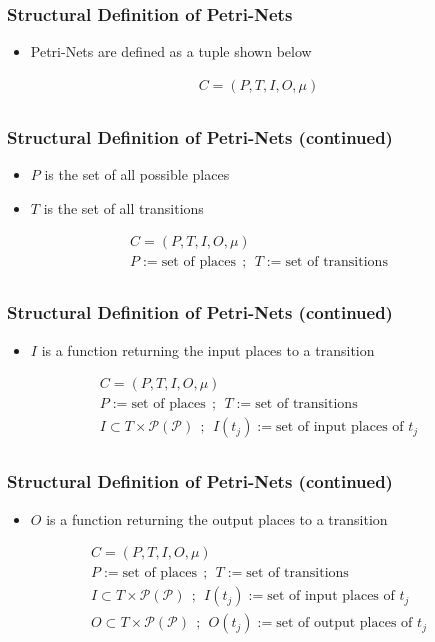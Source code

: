 \begin{frame}
    \frametitle{Structural Definition of Petri-Nets}
    \begin{itemize}
        \item {Petri-Nets are defined as a tuple shown below}
    \end{itemize}
    \begin{gather*}
        C = (P, T, I, O, \mu) \\
    \end{gather*}
\end{frame}
\begin{frame}
    \frametitle{Structural Definition of Petri-Nets (continued)}
    \begin{itemize}
        \item {$P$ is the set of all possible places}
        \item {$T$ is the set of all transitions}
    \end{itemize}
    \begin{gather*}
        C = (P, T, I, O, \mu) \\
        P := \text{set of places}~~;~~
        T := \text{set of transitions} \\
    \end{gather*}
\end{frame}
\begin{frame}
    \frametitle{Structural Definition of Petri-Nets (continued)}
    \begin{itemize}
        \item {$I$ is a function returning the input places to a transition}
    \end{itemize}
    \begin{gather*}
        C = (P, T, I, O, \mu) \\
        P := \text{set of places}~~;~~
        T := \text{set of transitions} \\
        I \subset T \times \mathcal{P(P)}~~;~~
        I(t_j) := \text{set of input places of $t_j$} \\
    \end{gather*}
\end{frame}
\begin{frame}
    \frametitle{Structural Definition of Petri-Nets (continued)}
    \begin{itemize}
        \item {$O$ is a function returning the output places to a transition}
    \end{itemize}
    \begin{gather*}
        C = (P, T, I, O, \mu) \\
        P := \text{set of places}~~;~~
        T := \text{set of transitions} \\
        I \subset T \times \mathcal{P(P)}~~;~~
        I(t_j) := \text{set of input places of $t_j$} \\
        O \subset T \times \mathcal{P(P)} ~~;~~
        O(t_j) := \text{set of output places of $t_j$} \\
    \end{gather*}
\end{frame}
